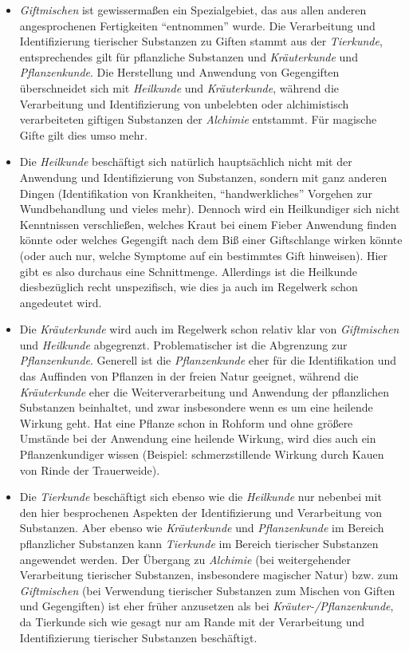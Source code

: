 \documentclass[10pt,a4paper,germanpar]{article}
\begin{document}
\begin{itemize}
  darstellt, aber auch mit viel Mystik und Esoterik durchdrungen ist.
\item \emph{Giftmischen} ist gewissermaßen ein Spezialgebiet, das aus
  allen anderen angesprochenen Fertigkeiten "`entnommen"' wurde. Die
  Verarbeitung und Identifizierung tierischer Substanzen zu Giften
  stammt aus der \emph{Tierkunde}, entsprechendes gilt für pflanzliche
  Substanzen und \emph{Kräuterkunde} und \emph{Pflanzenkunde}. Die
  Herstellung und Anwendung von Gegengiften überschneidet sich mit
  \emph{Heilkunde} und \emph{Kräuterkunde}, während die Verarbeitung
  und Identifizierung von unbelebten oder alchimistisch verarbeiteten
  giftigen Substanzen der \emph{Alchimie} entstammt. Für magische
  Gifte gilt dies umso mehr.
\item Die \emph{Heilkunde} beschäftigt sich natürlich hauptsächlich
  nicht mit der Anwendung und Identifizierung von Substanzen, sondern
  mit ganz anderen Dingen (Identifikation von Krankheiten,
  "`handwerkliches"' Vorgehen zur Wundbehandlung und vieles mehr).
  Dennoch wird ein Heilkundiger sich nicht Kenntnissen verschließen,
  welches Kraut bei einem Fieber Anwendung finden könnte oder welches
  Gegengift nach dem Biß einer Giftschlange wirken könnte (oder auch
  nur, welche Symptome auf ein bestimmtes Gift hinweisen). Hier gibt
  es also durchaus eine Schnittmenge. Allerdings ist die Heilkunde
  diesbezüglich recht unspezifisch, wie dies ja auch im Regelwerk
  schon angedeutet wird.
\item Die \emph{Kräuterkunde} wird auch im Regelwerk schon relativ
  klar von \emph{Giftmischen} und \emph{Heilkunde} abgegrenzt.
  Problematischer ist die Abgrenzung zur \emph{Pflanzenkunde}.
  Generell ist die \emph{Pflanzenkunde} eher für die Identifikation
  und das Auffinden von Pflanzen in der freien Natur geeignet, während
  die \emph{Kräuterkunde} eher die Weiterverarbeitung und Anwendung
  der pflanzlichen Substanzen beinhaltet, und zwar insbesondere wenn
  es um eine heilende Wirkung geht. Hat eine Pflanze schon in Rohform
  und ohne größere Umstände bei der Anwendung eine heilende Wirkung,
  wird dies auch ein Pflanzenkundiger wissen (Beispiel:
  schmerzstillende Wirkung durch Kauen von Rinde der Trauerweide).
\item Die \emph{Tierkunde} beschäftigt sich ebenso wie die \emph{Heilkunde}
  nur nebenbei mit den hier besprochenen Aspekten der Identifizierung und
  Verarbeitung von Substanzen. Aber ebenso wie \emph{Kräuterkunde} und
  \emph{Pflanzenkunde} im Bereich pflanzlicher Substanzen kann
  \emph{Tierkunde} im Bereich tierischer Substanzen angewendet werden. Der
  Übergang zu \emph{Alchimie} (bei weitergehender Verarbeitung tierischer
  Substanzen, insbesondere magischer Natur) bzw. zum \emph{Giftmischen} (bei
  Verwendung tierischer Substanzen zum Mischen von Giften und Gegengiften)
  ist eher früher anzusetzen als bei \emph{Kräuter-/Pflanzenkunde}, da
  Tierkunde sich wie gesagt nur am Rande mit der Verarbeitung und
  Identifizierung tierischer Substanzen beschäftigt.
\end{itemize}
\end{document}
